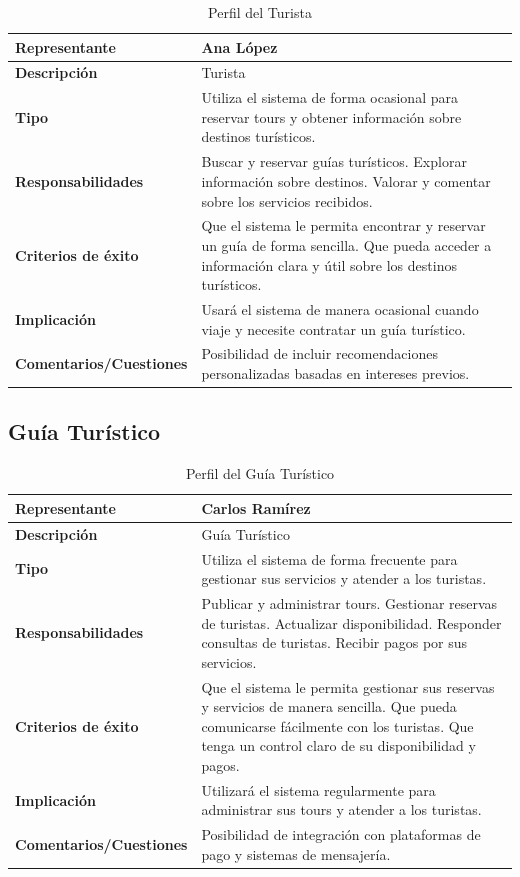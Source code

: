 \begin{table}[H]
\centering
\begin{tabular}{|p{5cm}|p{10cm}|}
\hline
\rowcolor[HTML]{CFE2F3} 
\textbf{Representante} & Ana López \\ \hline
\textbf{Descripción} & Turista \\ \hline
\textbf{Tipo} & Utiliza el sistema de forma ocasional para reservar tours y obtener información sobre destinos turísticos. \\ \hline
\textbf{Responsabilidades} & Buscar y reservar guías turísticos. Explorar información sobre destinos. Valorar y comentar sobre los servicios recibidos. \\ \hline
\textbf{Criterios de éxito} & Que el sistema le permita encontrar y reservar un guía de forma sencilla. Que pueda acceder a información clara y útil sobre los destinos turísticos. \\ \hline
\textbf{Implicación} & Usará el sistema de manera ocasional cuando viaje y necesite contratar un guía turístico. \\ \hline
\textbf{Comentarios/Cuestiones} & Posibilidad de incluir recomendaciones personalizadas basadas en intereses previos. \\ \hline
\end{tabular}
\caption{Perfil del Turista}
\label{tab:perfil_turista}
\end{table}


\subsection*{Guía Turístico}

\begin{table}[H]
\centering
\begin{tabular}{|p{5cm}|p{10cm}|}
\hline
\rowcolor[HTML]{CFE2F3} 
\textbf{Representante} & Carlos Ramírez \\ \hline
\textbf{Descripción} & Guía Turístico \\ \hline
\textbf{Tipo} & Utiliza el sistema de forma frecuente para gestionar sus servicios y atender a los turistas. \\ \hline
\textbf{Responsabilidades} & Publicar y administrar tours. Gestionar reservas de turistas. Actualizar disponibilidad. Responder consultas de turistas. Recibir pagos por sus servicios. \\ \hline
\textbf{Criterios de éxito} & Que el sistema le permita gestionar sus reservas y servicios de manera sencilla. Que pueda comunicarse fácilmente con los turistas. Que tenga un control claro de su disponibilidad y pagos. \\ \hline
\textbf{Implicación} & Utilizará el sistema regularmente para administrar sus tours y atender a los turistas. \\ \hline
\textbf{Comentarios/Cuestiones} & Posibilidad de integración con plataformas de pago y sistemas de mensajería. \\ \hline
\end{tabular}
\caption{Perfil del Guía Turístico}
\label{tab:perfil_guia}
\end{table}


